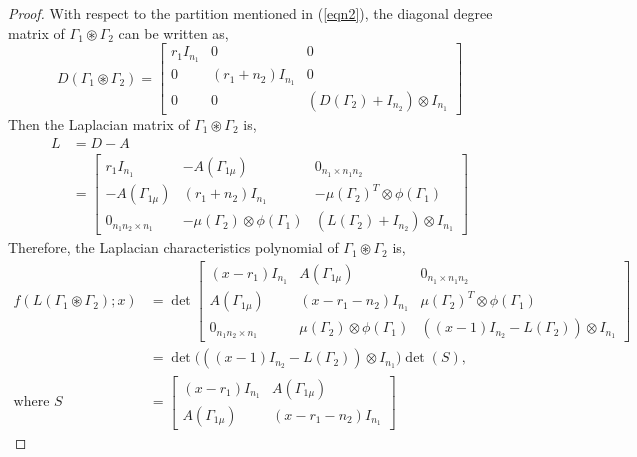 \documentclass[12pt,a4paper]{article}
\theoremstyle{definition}
\theoremstyle{remark}
\begin{document}
    \begin{proof}
        With respect to the partition mentioned in (\ref{eqn2}), the diagonal degree matrix of $\Gamma_1\circledast\Gamma_2$ can be written as, 
        $$D(\Gamma_1\circledast\Gamma_2)=\begin{bmatrix}
            r_1I_{n_1}& 0& 0\\
            0& (r_1+n_2)I_{n_1}& 0\\
            0& 0& (D(\Gamma_2)+I_{n_2})\otimes I_{n_1}
        \end{bmatrix}$$
        Then the Laplacian matrix of $\Gamma_1\circledast\Gamma_2$ is, 
        \begin{equation*}
            \begin{split}
                L&=D-A\\
                &=\begin{bmatrix}
                  r_1I_{n_1}& -A(\Gamma_{1\mu})& 0_{n_1\times n_1n_2}\\ 
            -A(\Gamma_{1\mu})& (r_1+n_2)I_{n_1}& -\mu(\Gamma_2)^T\otimes\phi(\Gamma_1)\\
            0_{n_1n_2\times n_1}& -\mu(\Gamma_2)\otimes\phi(\Gamma_1)& (L(\Gamma_2)+I_{n_2})\otimes I_{n_1}
                \end{bmatrix}
            \end{split}
        \end{equation*}
        Therefore, the Laplacian characteristics polynomial of $\Gamma_1\circledast\Gamma_2$ is,
        \begin{equation*}
            \begin{split}
                f(L(\Gamma_1\circledast\Gamma_2);x)&=\det\begin{bmatrix}
                    (x-r_1)I_{n_1}& A(\Gamma_{1\mu})& 0_{n_1\times n_1n_2}\\ 
            A(\Gamma_{1\mu})& (x-r_1-n_2)I_{n_1}& \mu(\Gamma_2)^T\otimes\phi(\Gamma_1)\\
            0_{n_1n_2\times n_1}& \mu(\Gamma_2)\otimes\phi(\Gamma_1)& ((x-1)I_{n_2}-L(\Gamma_2))\otimes I_{n_1}
                \end{bmatrix}\\
                &=\det\big(((x-1)I_{n_2}-L(\Gamma_2))\otimes I_{n_1}\big) \det(S),\\
                \text{where } S&=\begin{bmatrix}
                    (x-r_1)I_{n_1}& A(\Gamma_{1\mu})\\ 
            A(\Gamma_{1\mu})& (x-r_1-n_2)I_{n_1}

\end{bmatrix}
\end{split}
\end{equation*}
\end{proof}
\end{document}

